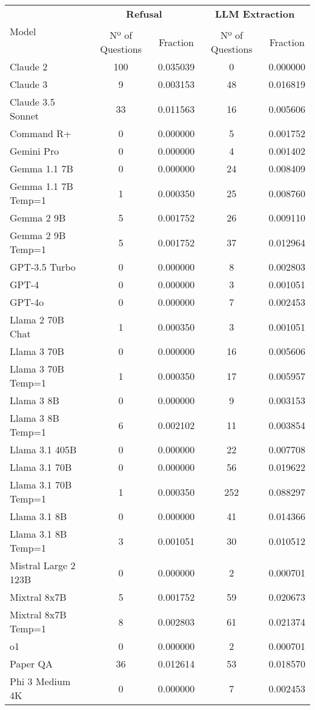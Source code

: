 \begin{tabular}{lcccc}
\toprule
\multirow{3}{*}{Model} & \multicolumn{2}{c}{\textbf{Refusal}} & \multicolumn{2}{c}{\textbf{LLM Extraction}}\\
\cmidrule(lr){2-3} \cmidrule(lr){4-5}\\
& Nº of Questions & Fraction & Nº of Questions & Fraction\\
\midrule
Claude 2 & 100 & 0.035039 & 0 & 0.000000 \\
Claude 3 & 9 & 0.003153 & 48 & 0.016819 \\
Claude 3.5 Sonnet & 33 & 0.011563 & 16 & 0.005606 \\
Command R+ & 0 & 0.000000 & 5 & 0.001752 \\
Gemini Pro & 0 & 0.000000 & 4 & 0.001402 \\
Gemma 1.1 7B & 0 & 0.000000 & 24 & 0.008409 \\
Gemma 1.1 7B Temp=1 & 1 & 0.000350 & 25 & 0.008760 \\
Gemma 2 9B & 5 & 0.001752 & 26 & 0.009110 \\
Gemma 2 9B Temp=1 & 5 & 0.001752 & 37 & 0.012964 \\
GPT-3.5 Turbo & 0 & 0.000000 & 8 & 0.002803 \\
GPT-4 & 0 & 0.000000 & 3 & 0.001051 \\
GPT-4o & 0 & 0.000000 & 7 & 0.002453 \\
Llama 2 70B Chat & 1 & 0.000350 & 3 & 0.001051 \\
Llama 3 70B & 0 & 0.000000 & 16 & 0.005606 \\
Llama 3 70B Temp=1 & 1 & 0.000350 & 17 & 0.005957 \\
Llama 3 8B & 0 & 0.000000 & 9 & 0.003153 \\
Llama 3 8B Temp=1 & 6 & 0.002102 & 11 & 0.003854 \\
Llama 3.1 405B & 0 & 0.000000 & 22 & 0.007708 \\
Llama 3.1 70B & 0 & 0.000000 & 56 & 0.019622 \\
Llama 3.1 70B Temp=1 & 1 & 0.000350 & 252 & 0.088297 \\
Llama 3.1 8B & 0 & 0.000000 & 41 & 0.014366 \\
Llama 3.1 8B Temp=1 & 3 & 0.001051 & 30 & 0.010512 \\
Mistral Large 2 123B & 0 & 0.000000 & 2 & 0.000701 \\
Mixtral 8x7B & 5 & 0.001752 & 59 & 0.020673 \\
Mixtral 8x7B Temp=1 & 8 & 0.002803 & 61 & 0.021374 \\
o1 & 0 & 0.000000 & 2 & 0.000701 \\
Paper QA & 36 & 0.012614 & 53 & 0.018570 \\
Phi 3 Medium 4K & 0 & 0.000000 & 7 & 0.002453 \\
\bottomrule
\end{tabular}
